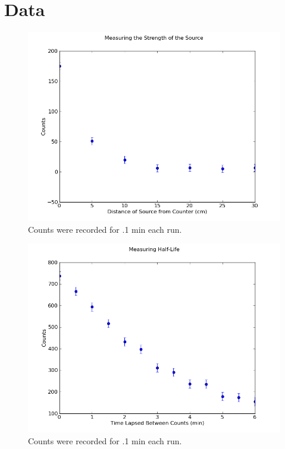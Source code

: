\documentclass[12pt]{article}
\begin{document}
\section{Data}
\begin{figure}[H]
\centering
\hspace{-0.0in}\includegraphics[scale=0.60]{Plot1.png}
\caption{Counts were recorded for .1 min each run. \label{fig:setup}}
\end{figure}

\begin{figure}[H]
\centering
\hspace{-0.0in}\includegraphics[scale=0.60]{Plot2.png}
\caption{Counts were recorded for .1 min each run. \label{fig:setup}}
\end{figure}
\end{document}
